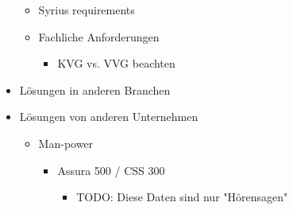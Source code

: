 \documentclass[12pt, twoside, table]{extarticle}
\begin{document}
\begin{itemize}
\begin{itemize}
		\item Syrius requirements
		\item Fachliche Anforderungen
        \begin{itemize}
    		\item KVG vs. VVG beachten
        \end{itemize}
    \end{itemize}
    \item Lösungen in anderen Branchen
    \item Lösungen von anderen Unternehmen
    \begin{itemize}
		\item Man-power
        \begin{itemize}
		    \item Assura 500 / CSS 300
            \begin{itemize}
			    \item TODO: Diese Daten sind nur "Hörensagen"
            \end{itemize}
        \end{itemize}
    \end{itemize}
\end{itemize}
\end{document}
